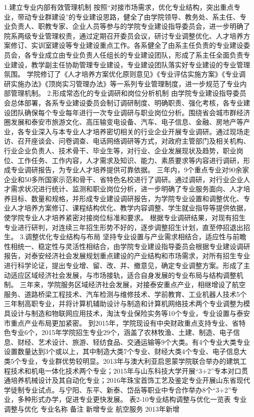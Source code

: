 1.建立专业内部有效管理机制
按照“对接市场需求，优化专业结构，突出重点专业，带动专业群建设”的专业建设思路，健全了由学院领导、教务处、系主任、专业负责人、职教专家、企业人员等参与的学院专业建设指导委员会，进一步明确了院系两级专业管理权责，通过定期召开委员会议，研讨专业调整优化、人才培养方案修订、实训室建设等专业建设重点工作。各系健全了由系主任负责的专业建设委员会，各专业成立由专业负责人任组长的专业建设团队，形成了系主任全面负责专业建设，教学副主任协助管理专业建设，专业建设团队落实好专业建设的专业管理氛围。
学院修订了《人才培养方案优化原则意见》《专业评估实施方案》《专业调研实施办法》《顶岗实习管理办法》等一系列专业管理制度，进一步规范了专业内部管理机制。
2.形成常态化的专业调研和岗位分析机制
由学院专业建设指导委员会总体部署，各系专业建设委员会制订调研制度、明确职责、强化考核，各专业建设团队确保每个专业每年进行一次专业调研与职业岗位分析。围绕省会城市群经济圈发展和泰安市旅游文化、高压输变电设备、汽车、电子信息、金融、房地产等产业，各专业深入与本专业人才培养密切相关的行业企业开展专业调研。通过现场走访、召开座谈会、问卷调查、电话网络调研等方式，对政府主管部门及相关机构、行业企业负责人、技术骨干、毕业生等，对行业、企业发展现状及趋势，职业岗位、工作任务、工作内容，人才需求及知识、能力、素质要求等内容进行调研，形成专业调研报告，为专业人才培养提供可靠依据。
三年内，9个重点专业对90余家企业和50多所国家示范和骨干、省特色名校进行了调研。通过调研，对行业企业人才需求状况进行统计、监测和职业岗位分析，进一步明确了专业服务面向、人才培养目标、数量和规格，并形成专业建设调研报告，为学院专业设置和调整优化、专业人才培养方案修订、课程结构优化、教学内容调整、学生就业指导等提供依据，使学院专业人才培养紧密对接岗位标准和要求。
根据专业调研结果，对现有招生专业进行研判，对连续三年招生形势不好的，逐步调整招生计划，直至停招退出招生。
3.调整优化专业结构与布局
坚持专业设置与产业需求相结合，适应性与前瞻性相统一、稳定性与灵活性相结合，由学院专业建设指导委员会根据专业建设调研报告，对泰安经济社会发展规划重点建设的产业结构和市场需求，对所有招生专业进行科学论证，提出专业增、留、改、并、撤意见，确定专业调整方案。形成了主动适应区域经济社会发展，与市场接轨，适合自身发展的专业布局与结构调整机制。
三年来，学院服务区域经济社会发展，对接泰安重点产业，相继增设了航空服务、道路桥梁工程技术、汽车检测与维修技术、学前教育、工业机器人技术5个三年制高职专业，并将计算机辅助设计与制造和计算机网络技术两个专业调整为模具设计与制造和物联网应用技术，淘汰专业保险实务等10个专业，专业设置与泰安市重点产业布局更加紧密。
到2015年，学院现设有中央财政重点支持专业、省特色专业6个，2015年学院招生专业29个，涵盖了农林牧渔、土建、制造、电子信息、财经、艺术设计、旅游、轻纺食品、交通运输等9个大类。有4个专业大类专业设置数量达到3个或以上，其中制造大类7个专业、财经大类4个专业、电子信息大类5个专业，专业群优势较明显。2013年与澳大利亚启思蒙学院联合举办的建筑工程技术和机电一体化技术两个专业；2015年与山东科技大学开展“3+2”专本对口贯通培养机械设计及其自动化专业；2016年珠宝首饰工艺及鉴定专业开展山东省现代学徒制专业试点。与宁阳、东平、新泰、岱岳等职业中专合作举办8个“3+2”专业，多种形式办学，促进专业更快发展。
表2-10专业结构调整与优化一览表
专业调整与优化
专业名称
备注
新增专业
航空服务
2013年新增


